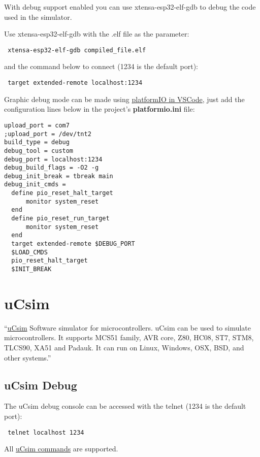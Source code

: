  With debug support enabled you can use xtensa-esp32-elf-gdb to debug the code used in the simulator. 
 
 Use xtensa-esp32-elf-gdb with the .elf file as the parameter:
 \begin{verbatim}
 xtensa-esp32-elf-gdb compiled_file.elf
 \end{verbatim}
 and the command below to connect (1234 is the default port):
 \begin{verbatim}
 target extended-remote localhost:1234
 \end{verbatim}

Graphic debug mode can be made using \href{https://platformio.org/}{platformIO in VSCode}, just add the configuration lines below in the project's \textbf{platformio.ini} file:
\begin{verbatim}
upload_port = com7
;upload_port = /dev/tnt2
build_type = debug
debug_tool = custom
debug_port = localhost:1234
debug_build_flags = -O2 -g
debug_init_break = tbreak main
debug_init_cmds =
  define pio_reset_halt_target
      monitor system_reset
  end
  define pio_reset_run_target
      monitor system_reset
  end
  target extended-remote $DEBUG_PORT
  $LOAD_CMDS
  pio_reset_halt_target
  $INIT_BREAK
\end{verbatim}
 
 
\section{uCsim} \hypertarget{def:ucsim}{}
``\href{http://mazsola.iit.uni-miskolc.hu/\%7edrdani/embedded/ucsim/}{uCsim} Software simulator for microcontrollers. uCsim can be used to simulate microcontrollers. It supports MCS51 family, AVR core, Z80, HC08, ST7, STM8, TLCS90, XA51 and Padauk. It can run on Linux, Windows, OSX, BSD, and other systems.''

\subsection{uCsim Debug} \hypertarget{def:ucsim}{}
  
The uCsim debug console can be accessed with the telnet (1234 is the default port):
 \begin{verbatim}
 telnet localhost 1234
 \end{verbatim}
 
All \href{http://mazsola.iit.uni-miskolc.hu/\%7edrdani/embedded/ucsim/cmd.html}{uCsim commands} are supported.  

